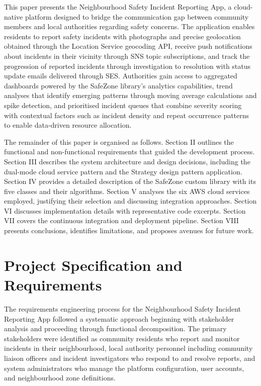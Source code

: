 \documentclass[conference]{IEEEtran}
\begin{document}
This paper presents the Neighbourhood Safety Incident Reporting App, a cloud-native platform designed to bridge the communication gap between community members and local authorities regarding safety concerns. The application enables residents to report safety incidents with photographs and precise geolocation obtained through the Location Service geocoding API, receive push notifications about incidents in their vicinity through SNS topic subscriptions, and track the progression of reported incidents through investigation to resolution with status update emails delivered through SES. Authorities gain access to aggregated dashboards powered by the SafeZone library's analytics capabilities, trend analyses that identify emerging patterns through moving average calculations and spike detection, and prioritised incident queues that combine severity scoring with contextual factors such as incident density and repeat occurrence patterns to enable data-driven resource allocation.

The remainder of this paper is organised as follows. Section II outlines the functional and non-functional requirements that guided the development process. Section III describes the system architecture and design decisions, including the dual-mode cloud service pattern and the Strategy design pattern application. Section IV provides a detailed description of the SafeZone custom library with its five classes and their algorithms. Section V analyses the six AWS cloud services employed, justifying their selection and discussing integration approaches. Section VI discusses implementation details with representative code excerpts. Section VII covers the continuous integration and deployment pipeline. Section VIII presents conclusions, identifies limitations, and proposes avenues for future work.

\section{Project Specification and Requirements}

The requirements engineering process for the Neighbourhood Safety Incident Reporting App followed a systematic approach beginning with stakeholder analysis and proceeding through functional decomposition. The primary stakeholders were identified as community residents who report and monitor incidents in their neighbourhood, local authority personnel including community liaison officers and incident investigators who respond to and resolve reports, and system administrators who manage the platform configuration, user accounts, and neighbourhood zone definitions.
\end{document}

